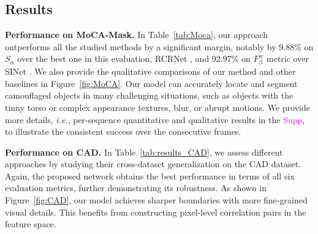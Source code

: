 \documentclass[10pt,twocolumn,letterpaper]{article}
\def\ie{\emph{i.e.}}
\newcommand{\supp}[1]{\textcolor{magenta}{#1}}
\def\figref#1{Figure~\ref{#1}}
\def\tabref#1{Table~\ref{#1}}
\begin{document}
\subsection{Results}
\textbf{Performance on MoCA-Mask.} 
In \tabref{tab:Moca}, our approach outperforms all the studied methods by a significant margin, notably by $ 9.88\% $ on $S_\alpha$ over the best one in this evaluation, RCRNet \cite{yan2019semi}, and $ 92.97\% $ on $F_\beta^w$ metric over SINet \cite{fan2020Camouflage}. 
We also provide the qualitative comparisons of our method and other baselines in \figref{fig:MoCA}. Our model can accurately locate and segment camouflaged objects in many challenging situations, such as objects with the tinny torso or complex appearance textures, blur, or abrupt motions. We provide more details, \ie, per-sequence quantitative and qualitative results in the \supp{Supp}, to illustrate the consistent success over the consecutive frames.  


\textbf{Performance on CAD.} In \tabref{tab:results_CAD}, we assess different approaches by studying their cross-dataset generalization on the CAD dataset. Again, the proposed network obtains the best performance in terms of all six evaluation metrics, further demonstrating its robustness. As shown in \figref{fig:CAD}, our model achieves sharper boundaries with more fine-grained visual details. This benefits from constructing pixel-level correlation pairs in the feature space.
\end{document}
